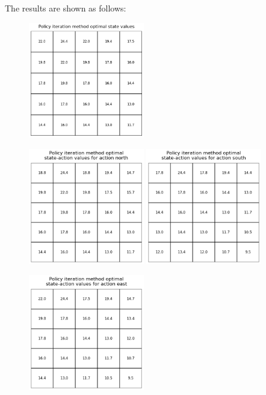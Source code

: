 \begin{homeworkProblem}
The results are shown as follows:
\begin{figure}[!htbp]
    \centering
    \includegraphics[width=0.45\textwidth]{./figure/p3_output/optimal/policy_iteration/V_value.png}
    \vspace{-0.5cm}
\end{figure}
\begin{figure}[h]
    \centering
    \includegraphics[width=0.45\textwidth]{./figure/p3_output/optimal/policy_iteration/Q_north.png}
    \includegraphics[width=0.45\textwidth]{./figure/p3_output/optimal/policy_iteration/Q_south.png}
\end{figure}
\begin{figure}[h]
    \centering
    \includegraphics[width=0.45\textwidth]{./figure/p3_output/optimal/policy_iteration/Q_east.png}

\end{figure}
\end{homeworkProblem}
